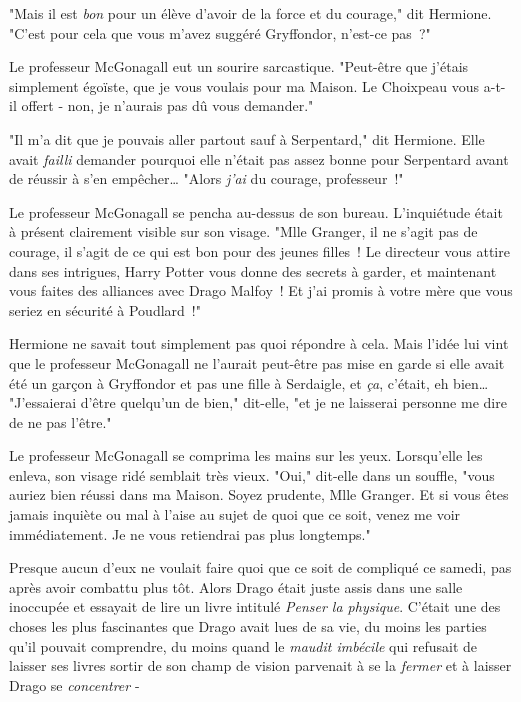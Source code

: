 "Mais il est \emph{bon} pour un élève d'avoir de la force et du courage," dit Hermione. "C'est pour cela que vous m'avez suggéré Gryffondor, n'est-ce pas~?"

Le professeur McGonagall eut un sourire sarcastique. "Peut-être que j'étais simplement égoïste, que je vous voulais pour ma Maison. Le Choixpeau vous a-t-il offert - non, je n'aurais pas dû vous demander."

"Il m'a dit que je pouvais aller partout sauf à Serpentard," dit Hermione. Elle avait \emph{failli} demander pourquoi elle n'était pas assez bonne pour Serpentard avant de réussir à s'en empêcher… "Alors \emph{j'ai} du courage, professeur~!"

Le professeur McGonagall se pencha au-dessus de son bureau. L'inquiétude était à présent clairement visible sur son visage. "Mlle Granger, il ne s'agit pas de courage, il s'agit de ce qui est bon pour des jeunes filles~! Le directeur vous attire dans ses intrigues, Harry Potter vous donne des secrets à garder, et maintenant vous faites des alliances avec Drago Malfoy~! Et j'ai promis à votre mère que vous seriez en sécurité à Poudlard~!"

Hermione ne savait tout simplement pas quoi répondre à cela. Mais l'idée lui vint que le professeur McGonagall ne l'aurait peut-être pas mise en garde si elle avait été un garçon à Gryffondor et pas une fille à Serdaigle, et \emph{ça}, c'était, eh bien… "J'essaierai d'être quelqu'un de bien," dit-elle, "et je ne laisserai personne me dire de ne pas l'être."

Le professeur McGonagall se comprima les mains sur les yeux. Lorsqu'elle les enleva, son visage ridé semblait très vieux. "Oui," dit-elle dans un souffle, "vous auriez bien réussi dans ma Maison. Soyez prudente, Mlle Granger. Et si vous êtes jamais inquiète ou mal à l'aise au sujet de quoi que ce soit, venez me voir immédiatement. Je ne vous retiendrai pas plus longtemps."

Presque aucun d'eux ne voulait faire quoi que ce soit de compliqué ce samedi, pas après avoir combattu plus tôt. Alors Drago était juste assis dans une salle inoccupée et essayait de lire un livre intitulé \emph{Penser la physique}. C'était une des choses les plus fascinantes que Drago avait lues de sa vie, du moins les parties qu'il pouvait comprendre, du moins quand le \emph{maudit imbécile} qui refusait de laisser ses livres sortir de son champ de vision parvenait à se la \emph{fermer} et à laisser Drago se \emph{concentrer} -

